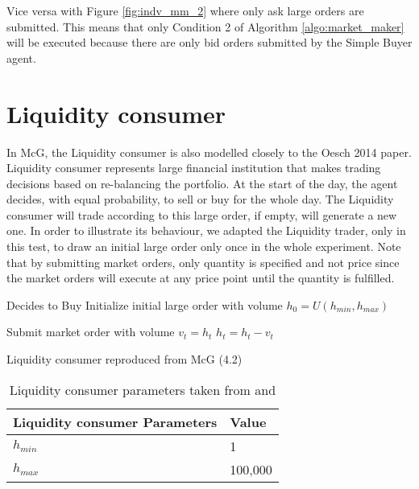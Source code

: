 Vice versa with Figure \ref{fig:indv_mm_2} where only ask large orders are submitted. This means that only Condition 2 of Algorithm \ref{algo:market_maker} will be executed because there are only bid orders submitted by the Simple Buyer agent.

\section{Liquidity consumer} 
In McG, the Liquidity consumer is also modelled closely to the Oesch 2014 \cite{Oesch} paper. Liquidity consumer represents large financial institution that makes trading decisions based on re-balancing the portfolio. At the start of the day, the agent decides, with equal probability, to sell or buy for the whole day. The Liquidity consumer will trade according to this large order, if empty, will generate a new one. In order to illustrate its behaviour, we adapted the Liquidity trader, only in this test, to draw an initial large order only once in the whole experiment. Note that by submitting market orders, only quantity is specified and not price since the market orders will execute at any price point until the quantity is fulfilled.  
\\
\begin{algorithm}[hbpt!]
\DontPrintSemicolon  
{} {
     {
    Decides to Buy\;
    }
    \EndIf
    Initialize initial large order with volume $h_0 = U(h_{min},h_{max})$\;  
  }
\EndIf

 {
    \tcc{$h_t = $ is the remaining volume at time t}
     {
    Submit market order with volume $v_t = h_t$\;
    }
    \EndIf
    $h_t = h_t - v_t$\;  
  }
\EndIf
\caption{{\sc Liquidity consumer reproduced from McG (4.2) \cite{McGroarty} }}
\label{algo:liquidity_consumer}
\end{algorithm}

\begin{table}[h]
\centering
\begin{tabular}{ |m||p{4cm}|} 
\hline
\textbf{Liquidity consumer Parameters}& \textbf{Value} \\
\hline
\hline
$h_{min}$ & 1 \\ 
\hline
$h_{max}$ & 100,000\\ 
\hline
\end{tabular}
\caption{Liquidity consumer parameters taken from \cite{McGroarty} and  \cite{Oesch}} 
\end{table}
\FloatBarrier 

